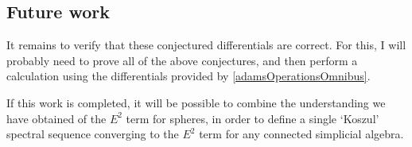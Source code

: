 \documentclass[11pt]{article}
\begin{document}
\subsection{Future work}
It remains to verify that these conjectured differentials are correct. For this, I will probably need to prove all of the above conjectures, and then perform a calculation using the differentials provided by \ref{adamsOperationsOmnibus}.

If this work is completed, it will be possible to combine the understanding we have obtained of the $E^2$ term for spheres, in order to define a single `Koszul' spectral sequence converging to the $E^2$ term for any connected simplicial algebra.



\printbibliography
\end{document}
